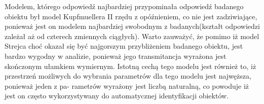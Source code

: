 \documentclass[12pt]{article}
\begin{document}
Modelem, którego odpowiedź najbardziej przypominała odpowiedź badanego obiektu był
model Kupfmuellera II rzędu z opóźnieniem, co nie jest zadziwiające, ponieważ jest on modelem
najbardziej swobodnym z badanych(kształt odpowiedzi zależał aż od czterech
zmiennych ciągłych).
Warto zauważyć, że pomimo iż model Strejca choć okazał się być najgorszym przybliżeniem
badanego obiektu, jest bardzo wygodny w analizie, ponieważ jego transmitancja wyrażona jest
skończonym ułamkiem wymiernym. Istotną cechą tego modelu jest również to, iż przestrzeń
możliwych do wybrania parametrów dla tego modelu jest najwęższa, ponieważ jeden z pa-
rametrów wyrażony jest liczbą naturalną, co powoduje iż jest on często wykorzystywany do
automatycznej identyfikacji obiektów.
 
\end{document}
